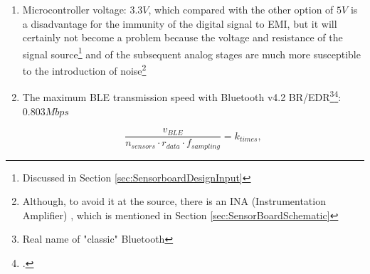 \documentclass[a4paper, 10pt, final]{article} %
\newcommand{\parenciteit}[2]{\textit{\parencite[#1]{#2}}} %
\begin{document}
\begin{enumerate}[label=\emph{(\arabic*)}]
            \begin{figure}[H]
                \centering
                \begin{minipage}[b]{.3\linewidth}
                    \centering
                    \[
                        f_{MSCLK} - f_{SSCLK} > 0Hz \mathrm{,}
                    \]
                \end{minipage}
                \begin{minipage}[b]{.3\linewidth}
                    \centering
                    \[
                        50MHz - 10MHz > 0Hz
                    \]
                \end{minipage}
                \begin{minipage}[b]{.3\linewidth}
                    \centering
                    \[
                        40MHz > 0Hz
                    \]
                \end{minipage}
            \end{figure}
            \noindent Knowing also the maximum communication frequency of the ADC, we can say that the microcontroller is not the limiting factor\footnote{Although it will be said in Section \ref{sec:SensorboardCharacteristics}that more is not necessary}. 
        \item Microcontroller voltage: $3.3V$, which compared with the other option of $5V$ is a disadvantage for the immunity of the digital signal to EMI, but it will certainly not become a problem because the voltage and resistance of the signal source\footnote{Discussed in Section \ref{sec:SensorboardDesignInput}} and of the subsequent analog stages are much more susceptible to the introduction of noise\footnote{Although, to avoid it at the source, there is an INA (Instrumentation Amplifier) \parenciteit{}{INA:Wiki}, which is mentioned in Section \ref{sec:SensorBoardSchematic}} 
        \item The maximum BLE transmission speed with Bluetooth v4.2 BR/EDR\footnote{Real name of "classic" Bluetooth}\footcite[]{BLEThroughput:Wiki}: $0.803Mbps$
            \begin{figure}[H]
                \centering
                \begin{minipage}[b]{.35\linewidth}
                    \centering
                    \[
                        \frac{v_{BLE}}{n_{sensors} \cdot r_{data} \cdot f_{sampling}} = k_{times} \mathrm{,}
\]
\end{minipage}
\end{figure}
\end{enumerate}
\end{document}
